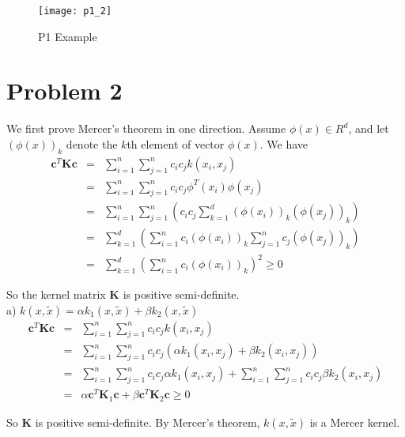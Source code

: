 \documentclass[12pt]{article}
\begin{document}
\begin{figure}[ht!]
  \centering
  \texttt{[image: p1\_2]}
  \caption{P1 Example \label{fig:p1_2}}
\end{figure}

\section*{Problem 2}

We first prove Mercer's theorem in one direction. Assume $\phi(x) \in R^d$, and let $(\phi(x))_k$ denote the $k$th element of vector $\phi(x)$. We have
\begin{eqnarray*}
  \textbf{c}^T \textbf{Kc}
  &=& \sum_{i=1}^n \sum_{j=1}^n c_i c_j k(x_i,x_j) \\
  &=& \sum_{i=1}^n \sum_{j=1}^n c_i c_j \phi^T(x_i) \phi(x_j) \\
  &=& \sum_{i=1}^n \sum_{j=1}^n \left(
  c_i c_j \sum_{k=1}^d (\phi(x_i))_k (\phi(x_j))_k 
  \right) \\
  &=& \sum_{k=1}^d \left( \sum_{i=1}^n c_i (\phi(x_i))_k
  \sum_{j=1}^n c_j (\phi(x_j))_k \right) \\
  &=& \sum_{k=1}^d \left( \sum_{i=1}^n c_i (\phi(x_i))_k \right)^2 \ge 0
\end{eqnarray*}

So the kernel matrix \textbf{K} is positive semi-definite. \\

a) $k(x, \tilde{x}) = \alpha k_1(x, \tilde{x}) + \beta k_2(x, \tilde{x})$
\begin{eqnarray*}
  \textbf{c}^T \textbf{Kc}
  &=& \sum_{i=1}^n \sum_{j=1}^n c_i c_j k(x_i,x_j) \\
  &=& \sum_{i=1}^n \sum_{j=1}^n c_i c_j 
  \left( \alpha k_1(x_i,x_j) + \beta k_2(x_i,x_j) \right) \\
  &=& \sum_{i=1}^n \sum_{j=1}^n c_i c_j \alpha k_1(x_i,x_j)
  + \sum_{i=1}^n \sum_{j=1}^n c_i c_j \beta k_2(x_i,x_j) \\
  &=& \alpha \textbf{c}^T \textbf{K}_1 \textbf{c}
  + \beta \textbf{c}^T \textbf{K}_2 \textbf{c} \ge 0
\end{eqnarray*}

So \textbf{K} is positive semi-definite. By Mercer's theorem, $k(x, \tilde{x})$ is a Mercer kernel. \\
\end{document}
